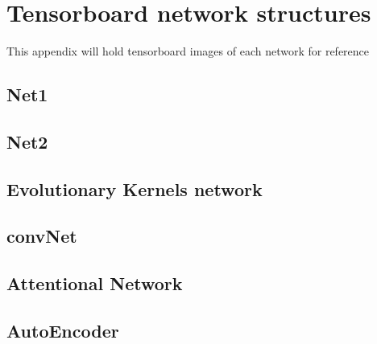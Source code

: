 \chapter{Tensorboard network structures}
\label{ch:tbnets}

This appendix will hold tensorboard images of each network for reference
\section{Net1}
\section{Net2}
\section{Evolutionary Kernels network}
\section{convNet}
\section{Attentional Network}
\section{AutoEncoder}
